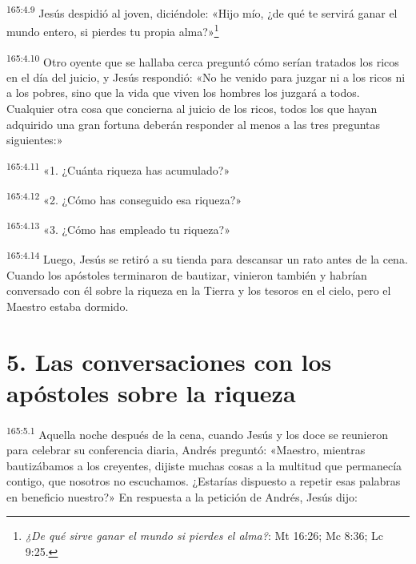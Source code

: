 \par
\textsuperscript{165:4.9} Jesús despidió al joven, diciéndole: «Hijo mío, ¿de qué te servirá ganar el mundo entero, si pierdes tu propia alma?»\footnote{\textit{¿De qué sirve ganar el mundo si pierdes el alma?}: Mt 16:26; Mc 8:36; Lc 9:25.}

\par
\textsuperscript{165:4.10} Otro oyente que se hallaba cerca preguntó cómo serían tratados los ricos en el día del juicio, y Jesús respondió: «No he venido para juzgar ni a los ricos ni a los pobres, sino que la vida que viven los hombres los juzgará a todos. Cualquier otra cosa que concierna al juicio de los ricos, todos los que hayan adquirido una gran fortuna deberán responder al menos a las tres preguntas siguientes:»

\par
\textsuperscript{165:4.11} «1. ¿Cuánta riqueza has acumulado?»

\par
\textsuperscript{165:4.12} «2. ¿Cómo has conseguido esa riqueza?»

\par
\textsuperscript{165:4.13} «3. ¿Cómo has empleado tu riqueza?»

\par
\textsuperscript{165:4.14} Luego, Jesús se retiró a su tienda para descansar un rato antes de la cena. Cuando los apóstoles terminaron de bautizar, vinieron también y habrían conversado con él sobre la riqueza en la Tierra y los tesoros en el cielo, pero el Maestro estaba dormido.

\section*{5. Las conversaciones con los apóstoles sobre la riqueza}
\par
\textsuperscript{165:5.1} Aquella noche después de la cena, cuando Jesús y los doce se reunieron para celebrar su conferencia diaria, Andrés preguntó: «Maestro, mientras bautizábamos a los creyentes, dijiste muchas cosas a la multitud que permanecía contigo, que nosotros no escuchamos. ¿Estarías dispuesto a repetir esas palabras en beneficio nuestro?» En respuesta a la petición de Andrés, Jesús dijo:


